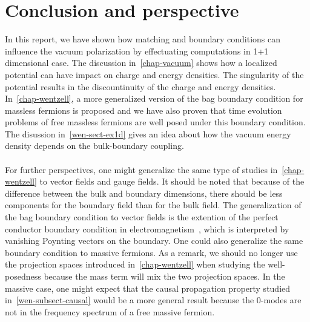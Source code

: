 \chapter{Conclusion and perspective}
In this report, we have shown how matching and boundary conditions can influence the vacuum polarization by effectuating computations in 1+1 dimensional case. 
The discussion in~\cref{chap-vacuum} shows how a localized  potential can have impact on charge and energy densities.
The singularity of the potential results in the discountinuity of the charge and energy densities. 
In~\cref{chap-wentzell}, a more generalized version of the bag boundary condition for massless fermions is proposed and we have also proven that time evolution problems of free massless fermions are well posed under this boundary condition.
The disussion in~\cref{wen-sect-ex1d} gives an idea about how the vacuum energy density depends on the bulk-boundary coupling.
\\\\
For further perspectives, 
one might generalize the same type of studies in~\cref{chap-wentzell} to vector fields and gauge fields.
It should be noted that because of the difference between the bulk and boundary dimensions, 
there should be less components for the boundary field than for the bulk field.
The generalization of the bag boundary condition to vector fields is the extention of the perfect conductor boundary condition in electromagnetism~\cite{Stokes2015}, 
which is interpreted by vanishing Poynting vectors on the boundary.
One could also generalize the same boundary condition to massive fermions. 
As a remark, 
we should no longer use the projection spaces introduced in~\cref{chap-wentzell} when studying the well-posedness because the mass term will mix the two projection spaces.
In the massive case, one might expect that the causal propagation property studied in~\cref{wen-subsect-causal} would be a more general result because the 0-modes are not in the frequency spectrum of a free massive fermion. 




